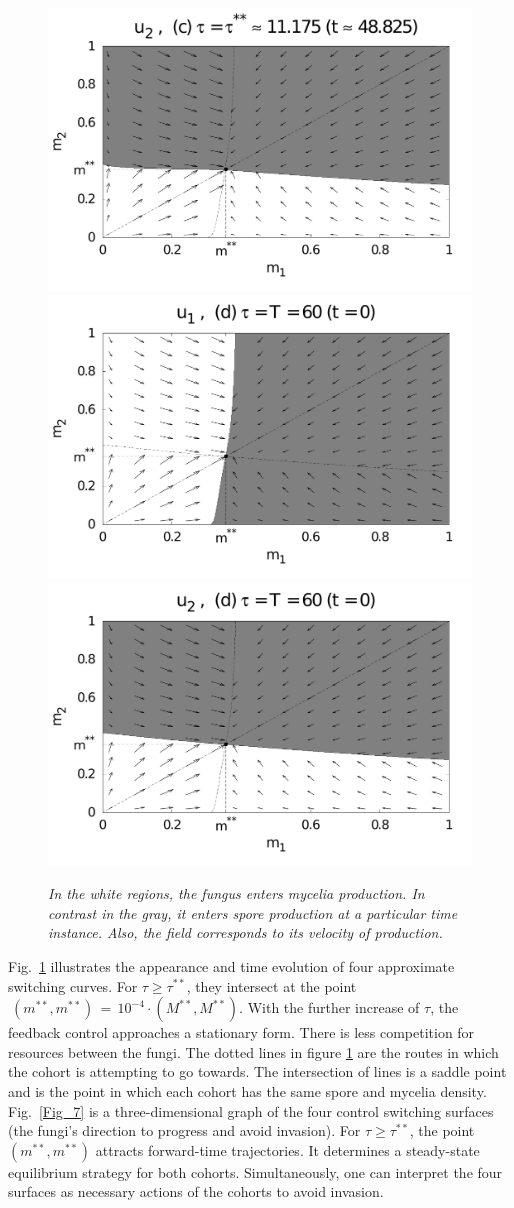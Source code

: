 \documentclass[11pt]{amsart}
\begin{document}
\begin{figure}
{\includegraphics[width = 0.48 \textwidth]{figures/Figure_5c_2.pdf} \\
\includegraphics[width = 0.48 \textwidth]{figures/Figure_5d_1.pdf}
\includegraphics[width = 0.48 \textwidth]{figures/Figure_5d_2.pdf}
}
\bf \caption{\it In the white regions, the fungus enters mycelia production. In contrast in the gray, it enters spore production at a particular time instance. Also, the field corresponds to its velocity of production. }
\label{Fig_5}
\end{figure}

Fig.~\ref{Fig_5} illustrates the appearance and time evolution of four
approximate switching curves. For $ \tau \geqslant \tau^{**} $, they intersect
at the point~$ \: \left( m^{**}, m^{**} \right) \, = \, 10^{-4}
\cdot \left( M^{**}, M^{**} \right) $. With the further increase of $ \tau $, the 
feedback control approaches a stationary form. There is less competition for resources between the fungi. The dotted lines in figure \ref{Fig_5} are the routes in which the cohort is attempting to go towards. The intersection of lines is a saddle point and is the point in which each cohort has the same spore and mycelia density. Fig.~\ref{Fig_7}
is a three-dimensional graph of the 
four control switching surfaces (the fungi's direction to progress and avoid invasion). 
For $ \tau \geqslant \tau^{**} $, the point~$ \left( m^{**}, m^{**} \right) $
attracts forward-time trajectories. It determines a steady-state equilibrium
strategy for both cohorts. Simultaneously, one can interpret the four surfaces as necessary actions of the cohorts to avoid invasion.
\end{document}
